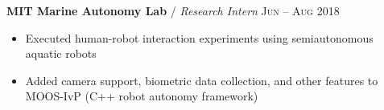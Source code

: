 \documentclass[10pt, a4paper]{article}
\newcommand{\years}[1]{\marginnote{\scriptsize #1}}
\begin{document}
\textbf{MIT Marine Autonomy Lab} / \textit{Research Intern} \hfill \textsc{Jun -- Aug 2018}\\
\begin{itemize}
    \vspace{-7mm}
    \item Executed human-robot interaction experiments using semiautonomous aquatic robots
    \item Added camera support, biometric data collection, and other features to MOOS-IvP (C++ robot autonomy framework)
\end{itemize}

\vspace{-7mm}
\end{document}
